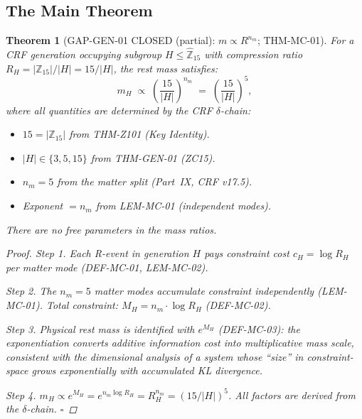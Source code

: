 \documentclass[12pt, a4paper]{article}
\newtheorem{theorem}{Theorem}[section]
\begin{document}
\subsection{The Main Theorem}
\label{zc16:sec:theorem}

\begin{theorem}[GAP-GEN-01 CLOSED (partial): $m \propto R^{n_m}$;
  THM-MC-01]
\label{zc16:thm:mass-formula}
For a CRF generation occupying subgroup $H \leq
\widehat{\mathbb{Z}}_{15}$ with compression ratio
$R_H = |\mathbb{Z}_{15}|/|H| = 15/|H|$, the rest mass satisfies:
\begin{equation}
\boxed{
  m_H \;\propto\;
  \left(\frac{15}{|H|}\right)^{n_m}
  \;=\; \left(\frac{15}{|H|}\right)^5,
}
\tag{EQ-MC-03}\label{zc16:eq:thm-mass}
\end{equation}
where all quantities are determined by the CRF $\delta$-chain:
\begin{itemize}[leftmargin=*, noitemsep]
  \item $15 = |\mathbb{Z}_{15}|$ from THM-Z101 (Key Identity).
  \item $|H| \in \{3, 5, 15\}$ from THM-GEN-01 (ZC15).
  \item $n_m = 5$ from the matter split (Part~IX, CRF v17.5).
  \item Exponent $= n_m$ from LEM-MC-01 (independent modes).
\end{itemize}
There are no free parameters in the mass \emph{ratios}.

\begin{proof}
\textit{Step 1.} Each R-event in generation $H$ pays
constraint cost $c_H = \log R_H$ per matter mode
(DEF-MC-01, LEM-MC-02).

\textit{Step 2.} The $n_m = 5$ matter modes accumulate
constraint independently (LEM-MC-01). Total constraint:
$M_H = n_m \cdot \log R_H$ (DEF-MC-02).

\textit{Step 3.} Physical rest mass is identified with
$e^{M_H}$ (DEF-MC-03): the exponentiation converts
additive information cost into multiplicative mass scale,
consistent with the dimensional analysis of a system
whose ``size'' in constraint-space grows exponentially
with accumulated KL divergence.

\textit{Step 4.} $m_H \propto e^{M_H} = e^{n_m \log R_H}
= R_H^{n_m} = (15/|H|)^5$. All factors are derived
from the $\delta$-chain. \hfill$\square$
\end{proof}
\end{theorem}
\end{document}

